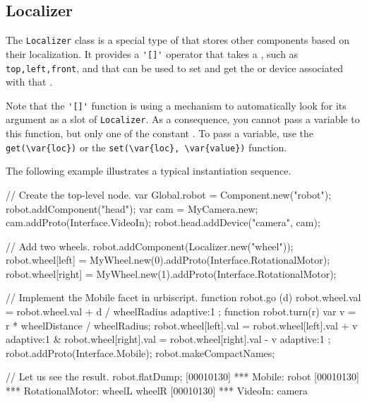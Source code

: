 \subsection{Localizer}

The \lstinline{Localizer} class is a special type of 
that stores other components based on their localization. It provides a
\lstinline{'[]'} operator that takes a , such as
\lstinline|top,left,front|, and that can be used to set and get the
 or device associated with that
.

Note that the \lstinline{'[]'} function is using a mechanism to
automatically look for its argument as a slot of \lstinline{Localizer}. As a
consequence, you cannot pass a variable to this function, but only one of
the constant .  To pass a variable, use the
\lstinline|get(\var{loc})| or the \lstinline|set(\var{loc}, \var{value})|
function.

The following example illustrates a typical instantiation sequence.

\begin{urbiunchecked}
// Create the top-level node.
var Global.robot = Component.new("robot");
robot.addComponent("head");
var cam = MyCamera.new;
cam.addProto(Interface.VideoIn);
robot.head.addDevice("camera", cam);

// Add two wheels.
robot.addComponent(Localizer.new("wheel"));
robot.wheel[left] = MyWheel.new(0).addProto(Interface.RotationalMotor);
robot.wheel[right] = MyWheel.new(1).addProto(Interface.RotationalMotor);

// Implement the Mobile facet in urbiscript.
function robot.go (d)
{
  robot.wheel.val = robot.wheel.val + d / wheelRadius adaptive:1
};
function robot.turn(r)
{
  var v = r * wheelDistance / wheelRadius;
  robot.wheel[left].val = robot.wheel[left].val + v adaptive:1 &
  robot.wheel[right].val = robot.wheel[right].val - v adaptive:1
};
robot.addProto(Interface.Mobile);
robot.makeCompactNames;

// Let us see the result.
robot.flatDump;
[00010130] *** Mobile: robot
[00010130] *** RotationalMotor: wheelL wheelR
[00010130] *** VideoIn: camera
\end{urbiunchecked}

\let\subsection\subsectionOrig

